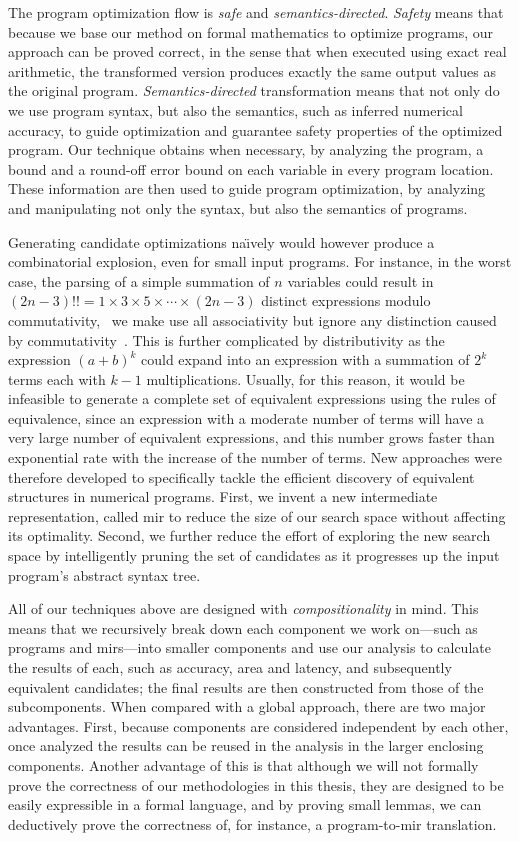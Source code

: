 The program optimization flow is \emph{safe} and \emph{semantics-directed}.
\emph{Safety} means that because we base our method on formal mathematics to
optimize programs, our approach can be proved correct, in the sense that when
executed using exact real arithmetic, the transformed version produces exactly
the same output values as the original program. \emph{Semantics-directed}
transformation means that not only do we use program syntax, but also the
semantics, such as inferred numerical accuracy, to guide optimization and
guarantee safety properties of the optimized program.  Our technique obtains
when necessary, by analyzing the program, a bound and a round-off error bound
on each variable in every program location.  These information are then used to
guide program optimization, by analyzing and manipulating not only the syntax,
but also the semantics of programs.

Generating candidate optimizations na{\"\i}vely would however produce a
combinatorial explosion, even for small input programs.  For instance, in the
worst case, the parsing of a simple summation of $n$ variables could result
in $(2n - 3)!! = 1 \times 3 \times 5 \times \cdots \times (2n - 3)$ distinct
expressions modulo commutativity, \ie~we make use all associativity but ignore
any distinction caused by commutativity~\cite{ioualalen, mouilleron}.  This is
further complicated by distributivity as the expression ${(a + b)}^k$ could
expand into an expression with a summation of $2^k$ terms each with $k - 1$
multiplications.  Usually, for this reason, it would be infeasible to generate
a complete set of equivalent expressions using the rules of equivalence, since
an expression with a moderate number of terms will have a very large number of
equivalent expressions, and this number grows faster than exponential rate with
the increase of the number of terms.  New approaches were therefore developed
to specifically tackle the efficient discovery of equivalent structures in
numerical programs.  First, we invent a new intermediate representation,
called \gls{mir} to reduce the size of our search space without affecting its
optimality.  Second, we further reduce the effort of exploring the new search
space by intelligently pruning the set of candidates as it progresses up the
input program's abstract syntax tree.

All of our techniques above are designed with \emph{compositionality} in mind.
This means that we recursively break down each component we work on---such
as programs and \glspl{mir}---into smaller components and use our analysis
to calculate the results of each, such as accuracy, area and latency, and
subsequently equivalent candidates; the final results are then constructed from
those of the subcomponents.  When compared with a global approach, there are
two major advantages.  First, because components are considered independent
by each other, once analyzed the results can be reused in the analysis in the
larger enclosing components.  Another advantage of this is that although we
will not formally prove the correctness of our methodologies in this thesis,
they are designed to be easily expressible in a formal language, and by proving
small lemmas, we can deductively prove the correctness of, for instance, a
program-to-\gls{mir} translation.
